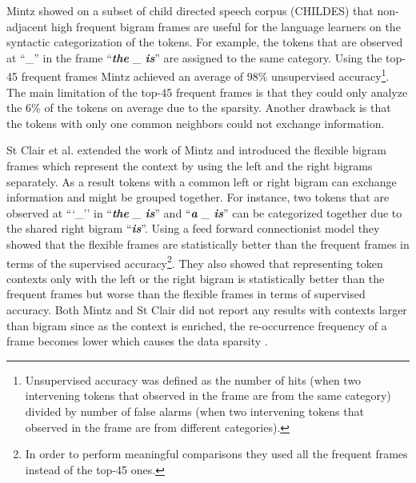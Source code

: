 Mintz  showed on a subset of child
directed speech corpus (CHILDES) \cite{macwhinney2000childes} that
non-adjacent high frequent bigram frames are useful for the language
learners on the syntactic categorization of the tokens.  For example,
the tokens that are observed at ``\_'' in the frame ``{\em {\bf the}
  \_ {\bf is}}'' are assigned to the same category.  Using the top-45
frequent frames Mintz achieved an average of 98\% unsupervised
accuracy\footnote{Unsupervised accuracy was defined as the number of
  hits (when two intervening tokens that observed in the frame are
  from the same category) divided by number of false alarms (when two
  intervening tokens that observed in the frame are from different
  categories).}.  The main limitation of the top-45 frequent frames is
that they could only analyze the 6\% of the tokens on average due to
the sparsity.  Another drawback is that the tokens with only one
common neighbors could not exchange information.

St Clair et al.   extended the work of Mintz
 and introduced the flexible bigram
frames which represent the context by using the left and the right
bigrams separately.  As a result tokens with a common left or right
bigram can exchange information and might be grouped together.  For
instance, two tokens that are observed at ```\_'' in ``{\em {\bf the}
  \_ {\bf is}}'' and ``{\em {\bf a} \_ {\bf is}}'' can be categorized
together due to the shared right bigram ``{\em{\bf is}}''.  Using a
feed forward connectionist model they showed that the flexible frames
are statistically better than the frequent frames in terms of the
supervised accuracy\footnote{In order to perform meaningful
  comparisons they used all the frequent frames instead of the top-45
  ones.}.  They also showed that representing token contexts only with
the left or the right bigram is statistically better than the frequent
frames but worse than the flexible frames in terms of supervised
accuracy.  Both Mintz  and St Clair
 did not report any results with contexts larger
than bigram since as the context is enriched, the re-occurrence
frequency of a frame becomes lower which causes the data sparsity
\cite{manning99foundations}.

